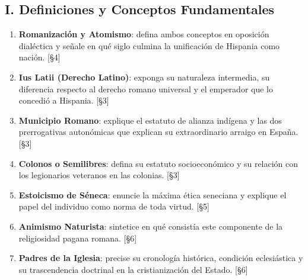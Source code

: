 \documentclass[11pt,letterpaper]{article}
\begin{document}
\subsection*{I. Definiciones y Conceptos Fundamentales}
\begin{enumerate}
  \item \textbf{Romanización y Atomismo}: defina ambos conceptos en oposición dialéctica y señale en qué siglo culmina la unificación de Hispania como nación. [§4]
  \item \textbf{Ius Latii (Derecho Latino)}: exponga su naturaleza intermedia, su diferencia respecto al derecho romano universal y el emperador que lo concedió a Hispania. [§3]
  \item \textbf{Municipio Romano}: explique el estatuto de alianza indígena y las dos prerrogativas autonómicas que explican su extraordinario arraigo en España. [§3]
  \item \textbf{Colonos o Semilibres}: defina su estatuto socioeconómico y su relación con los legionarios veteranos en las colonias. [§3]
  \item \textbf{Estoicismo de Séneca}: enuncie la máxima ética seneciana y explique el papel del individuo como norma de toda virtud. [§5]
  \item \textbf{Animismo Naturista}: sintetice en qué consistía este componente de la religiosidad pagana romana. [§6]
  \item \textbf{Padres de la Iglesia}: precise su cronología histórica, condición eclesiástica y su trascendencia doctrinal en la cristianización del Estado. [§6]
\end{enumerate}
\end{document}
